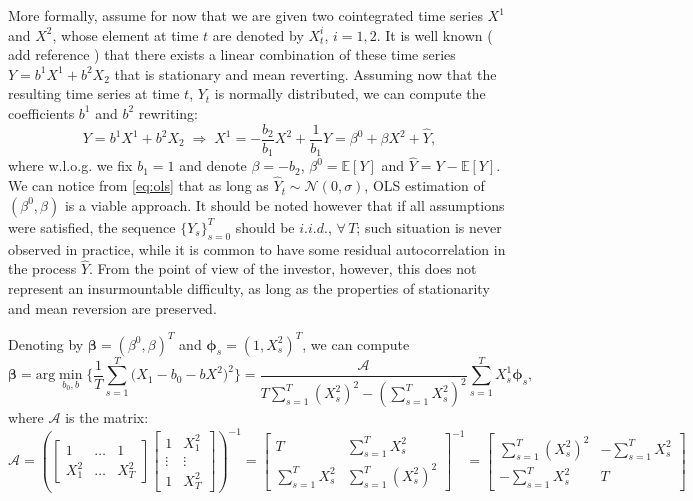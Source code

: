 \documentclass[a4paper,11pt]{article}
\theoremstyle{remark}
\theoremstyle{plain}
\newcommand\ab[1]{{\color{blue} #1 }}
\begin{document}
More formally, assume for now that we are given two cointegrated time series $X^1$ and $X^2$, whose element at time $t$ are denoted by $X^i_t$, $i=1,2$. It is well known (\ab{add reference}) that there exists a linear combination of these time series $Y=b^1X^1+b^2X_2$ that is stationary and mean reverting. Assuming now that the resulting time series at time $t$, $Y_t$ is normally distributed, we can compute the coefficients $b^1$ and $b^2$ rewriting:
\begin{equation}
\label{eq:ols}
Y=b^1X^1+b^2X_2\;\Rightarrow\;X^1=-\frac{b_2}{b_1}X^2+\frac{1}{b_1}Y=\beta^0+\beta X^2+\hat{Y},
\end{equation}
where w.l.o.g. we fix $b_1=1$ and denote $\beta=-b_2$, $\beta^0=\mathbb{E}[Y]$ and $\hat{Y}=Y-\mathbb{E}[Y]$. We can notice from \eqref{eq:ols} that as long as $\hat{Y}_t\sim\mathcal{N}(0,\sigma)$, OLS estimation of $(\beta^0,\beta)$ is a viable approach. 
It should be noted however that if all assumptions were satisfied, the sequence $\{Y_s\}_{s=0}^T$ should be $i.i.d.$, $\forall\,T$; such situation is never observed in practice, while it is common to have some residual autocorrelation in the process $\hat{Y}$. From the point of view of the investor, however, this does not represent an insurmountable difficulty, as long as the properties of stationarity and mean reversion are preserved.

Denoting by $\boldsymbol{\beta}=(\beta^0,\beta)^T$ and $\boldsymbol{\phi}_s=(1, X^2_s)^T$, we can compute
\begin{equation}
\label{eq:simpleOLS}
\boldsymbol{\beta}=\text{arg}\min\limits_{b_0,b}\Big\{\frac{1}{T}\sum\limits_{s=1}^{T}\big(X_1-b_0-b X^2\big)^2 \Big\}=\frac{\mathcal{A}}{T\sum\limits_{s=1}^{T}(X^2_s)^2-\left(\sum\limits_{s=1}^{T}X^2_s\right)^2}\sum\limits_{s=1}^{T}X^1_s \boldsymbol{\phi}_s,
\end{equation}
where $\mathcal{A}$ is the matrix:
\[
\mathcal{A}=\left(\begin{bmatrix}
    1 & \dots & 1\\
    X^2_1 & \dots & X^2_T 
\end{bmatrix}
\begin{bmatrix}
    1 & X^2_1 \\
    \vdots & \vdots \\
     1 & X^2_T
\end{bmatrix}
\right)^{-1}=\begin{bmatrix}
     T & \sum_{s=1}^{T}X^2_s \\
    \sum_{s=1}^{T}X^2_s & \sum_{s=1}^{T}(X^2_s)^2
\end{bmatrix}^{-1}=\begin{bmatrix}
    \sum_{s=1}^{T}(X^2_s)^2 & - \sum_{s=1}^{T}X^2_s \\
    - \sum_{s=1}^{T}X^2_s & T
\end{bmatrix}
\]
\end{document}
